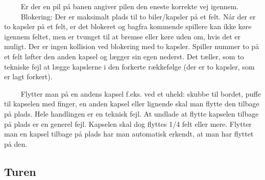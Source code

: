 \documentclass[12pt]{article}
\begin{document}
$\qquad$ Er der en pil på banen angiver pilen den eneste korrekte vej igennem.\\

$\qquad$ Blokering: Der er maksimalt plads til to biler/kapsler på et felt. Når der er to kapsler på et felt, er det blokeret og bagfra kommende spillere kan ikke køre igennem feltet, men er tvunget til at bremse eller køre uden om, hvis det er muligt. Der er ingen kollision ved blokering med to kapsler. Spiller nummer to på et felt løfter den anden kapsel og lægger sin egen nederst. Det tæller, som to tekniske fejl at lægge kapslerne i den forkerte rækkefølge (der er to kapsler, som er lagt forkert).

$\qquad$ Flytter man på en andens kapsel f.eks. ved et uheld: skubbe til bordet, puffe til kapselen med finger, en anden kapsel eller lignende skal man flytte den tilbage på plads. Hele handlingen er en teknisk fejl. At undlade at flytte kapselen tilbage på plads er en generel fejl. Kapselen skal dog flyttes 1/4 felt eller mere. Flytter man en kapsel tilbage på plads har man automatisk erkendt, at man har flyttet på den.




\subsection*{Turen}
\end{document}
